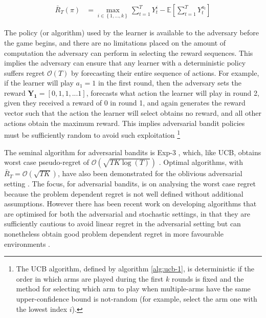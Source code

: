 \documentclass[11pt,a4paper,oneside]{book}
\newcommand{\E}[1]{\mathbb E\left[{#1}\right]}
\newcommand{\set}[1]{\left\{#1\right\}}
\newcommand{\eqn}[1]{\begin{align}#1\end{align}}
\newcommand{\bigo}[1]{\mathcal{O}\left( #1 \right)}
\newcommand{\cfb}[2]{{#1}_t^{#2}} %
\renewcommand{\vec}[1]{\boldsymbol{#1}}
\newcommand{\regret}{\bar{R}_{T}} %
\theoremstyle{plain}
\theoremstyle{definition}
\begin{document}
\eqn{
\label{eqn:pseudo_regret-adversarial}
\regret(\pi) &= \max_{i \in \set{1,...,k}}{\sum_{t=1}^T{\cfb{Y}{i}}} - \E{\sum_{t=1}^T{\cfb{Y}{a_t}}}
}

The policy (or algorithm) used by the learner is available to the adversary before the game begins, and there are no limitations placed on the amount of computation the adversary can perform in selecting the reward sequences. This implies the adversary can ensure that any learner with a deterministic policy suffers regret $\bigo{T}$ by forecasting their entire sequence of actions. For example, if the learner will play $a_1 = 1$ in the first round, then the adversary sets the reward $\vec{Y_1} = [0,1,1,...1]$, forecasts what action the learner will play in round 2, given they received a reward of 0 in round 1, and again generates the reward vector such that the action the learner will select obtains no reward, and all other actions obtain the maximum reward. This implies adversarial bandit policies must be sufficiently random to avoid such exploitation \footnote{The UCB algorithm, defined by algorithm \ref{alg:ucb-1}, is deterministic if the order in which arms are played during the first $k$ rounds is fixed and the method for selecting which arm to play when multiple-arms have the same upper-confidence bound is not-random (for example, select the arm one with the lowest index $i$).}

The seminal algorithm for adversarial bandits is Exp-3 \citep{Auer2002}, which, like UCB, obtains worst case pseudo-regret of $\bigo{\sqrt{TK\log(T)}}$  \citep{Auer1995}. Optimal algorithms, with $\regret = \bigo{\sqrt{TK}}$, have also been demonstrated for the oblivious adversarial setting \citep{Audibert2009}. The focus, for adversarial bandits, is on analysing the worst case regret because the problem dependent regret is not well defined without additional assumptions. However there has been recent work on developing algorithms that are optimised for both the adversarial and stochastic settings, in that they are sufficiently cautious to avoid linear regret in the adversarial setting but can nonetheless obtain good problem dependent regret in more favourable environments \citep{bubeck2012bothworlds,Auer2016}. 
\end{document}
